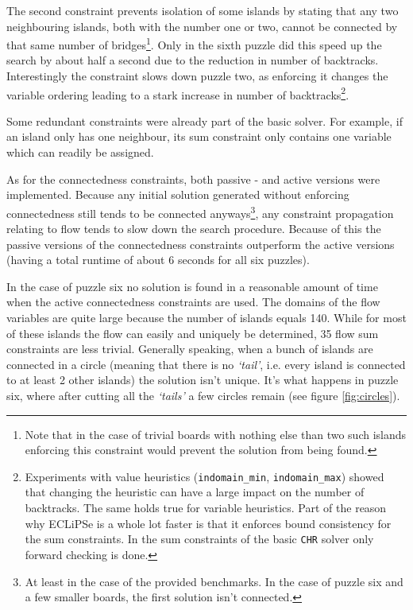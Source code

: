 The second constraint prevents isolation of some islands by stating that any two neighbouring islands, both with the number one or two, cannot be connected by that same number of bridges\footnote{Note that in the case of trivial boards with nothing else than two such islands enforcing this constraint would prevent the solution from being found.}. Only in the sixth puzzle did this speed up the search by about half a second due to the reduction in number of backtracks. Interestingly the constraint slows down puzzle two, as enforcing it changes the variable ordering leading to a stark increase in number of backtracks\footnote{Experiments with value heuristics (\texttt{indomain\_min}, \texttt{indomain\_max}) showed that changing the heuristic can have a large impact on the number of backtracks. The same holds true for variable heuristics. Part of the reason why ECLiPSe is a whole lot faster is that it enforces bound consistency for the sum constraints. In the sum constraints of the basic \texttt{CHR} solver only forward checking is done.}.\\\par

Some redundant constraints were already part of the basic solver. For example, if an island only has one neighbour, its sum constraint only contains one variable which can readily be assigned.\\\par

As for the connectedness constraints, both passive - and active versions were implemented. Because any initial solution generated without enforcing connectedness still tends to be connected anyways\footnote{At least in the case of the provided benchmarks. In the case of puzzle six and a few smaller boards, the first solution isn't connected.}, any constraint propagation relating to flow tends to slow down the search procedure. Because of this the passive versions of the connectedness constraints outperform the active versions (having a total runtime of about 6 seconds for all six puzzles).\\\par

In the case of puzzle six no solution is found in a reasonable amount of time when the active connectedness constraints are used. The domains of the flow variables are quite large because the number of islands equals 140. While for most of these islands the flow can easily and uniquely be determined, 35 flow sum constraints are less trivial. Generally speaking, when a bunch of islands are connected in a circle (meaning that there is no \textit{`tail'}, i.e. every island is connected to at least 2 other islands) the solution isn't unique. It's what happens in puzzle six, where after cutting all the \textit{`tails'} a few circles remain (see figure \ref{fig:circles}).

